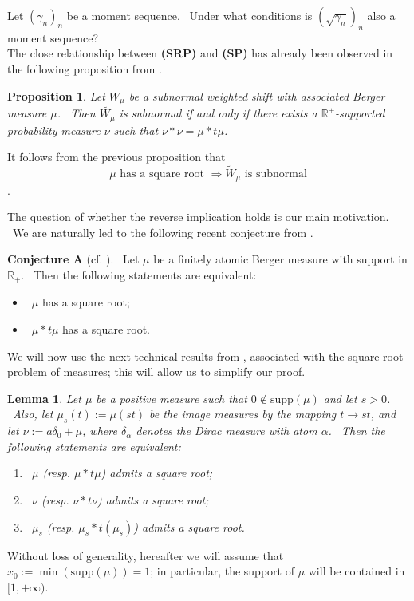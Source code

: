 \documentclass[12pt]{amsart}
\newtheorem{lem}[thm]{Lemma}
\newtheorem{prop}[thm]{Proposition}
\newcommand{\R}{\mathbb{R}}
\begin{document}
Let $(\gamma_n)_n$ be a moment sequence. \ Under what conditions is  $(\sqrt{\gamma_n})_n$ also a moment sequence?\\

The close relationship between {\bf (SRP)} and  {\bf (SP)} has already been observed in the following proposition from \cite{Curto2019}.

\begin{prop}\label{lemmeconvolution}
	Let $W_\mu$ be a subnormal weighted shift with associated Berger measure  $\mu$. \ Then  $\widetilde{ W_\mu}$ is subnormal if and only if there exists a $ \mathbb{R}^+$-supported probability measure $\nu$ such that $\nu*\nu=\mu*t\mu$.  
\end{prop}
It follows from the previous proposition that 
$$ \mu \mbox{ has a square root } \Rightarrow {\widetilde{ W}_\mu} \mbox{ is subnormal} $$.

The question of whether the reverse implication holds is our main motivation. \ We are naturally led to the following recent conjecture from \cite{Curto2019}.  

{\bf Conjecture A} (cf. \cite[Conjecture 4.6]{Curto2019}). \ 
Let $\mu$ be a finitely atomic Berger measure with support in $\R_+$. \ Then the following statements are equivalent:
\begin{itemize}
    \item[(i)] \ $\mu$ has a square root;
    \item[(ii)] \ $\mu*t\mu$ has a square root.
\end{itemize}

We will now use the next technical results from \cite{EEEEE}, associated with the square root problem of measures; this will allow us to simplify our proof.

 
\begin{lem}\label{121}
    Let $\mu$ be a positive measure such that $0\notin \mathrm{supp}(\mu)$ and let $s>0$. \ Also, let $\mu_s(t):= \mu(st)$  be    the image measures by the mapping $t\to st$, and
    let $\nu:=a\delta_0+\mu$, where $\delta_\alpha$ denotes  the Dirac measure with atom $\alpha$. \ Then the following statements are equivalent:   \begin{enumerate}
        \item \ $\mu$ \; (resp. $\mu*t\mu$) admits a square root;
        \item \ $\nu$ \; (resp. $\nu*t\nu$) admits a square root;
        \item \ $\mu_s$ \; (resp. $\mu_s*t(\mu_s)$) admits a square root.
    \end{enumerate}
\end{lem}
\medskip
Without loss of generality, hereafter we will assume that $
x_0:=\min(\textrm{supp}(\mu))=1$; in particular, the support of $\mu$ will be contained in $[1,+\infty)$.
\end{document}

